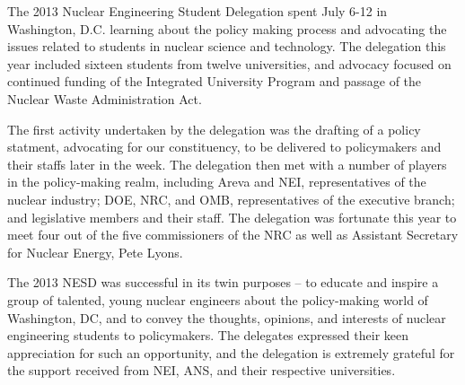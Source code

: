 The 2013 Nuclear Engineering Student Delegation spent July 6-12 in Washington,
D.C. learning about the policy making process and advocating the issues related
to students in nuclear science and technology. The delegation this year included
sixteen students from twelve universities, and advocacy focused on continued
funding of the Integrated University Program and passage of the Nuclear Waste
Administration Act.

The first activity undertaken by the delegation was the drafting of a policy
statment, advocating for our constituency, to be delivered to policymakers and
their staffs later in the week. The delegation then met with a number of players
in the policy-making realm, including Areva and NEI, representatives of the
nuclear industry; DOE, NRC, and OMB, representatives of the executive branch;
and legislative members and their staff. The delegation was fortunate this year
to meet four out of the five commissioners of the NRC as well as Assistant
Secretary for Nuclear Energy, Pete Lyons.

The 2013 NESD was successful in its twin purposes – to educate and inspire a
group of talented, young nuclear engineers about the policy-making world of
Washington, DC, and to convey the thoughts, opinions, and interests of nuclear
engineering students to policymakers. The delegates expressed their keen
appreciation for such an opportunity, and the delegation is extremely grateful
for the support received from NEI, ANS, and their respective universities.
